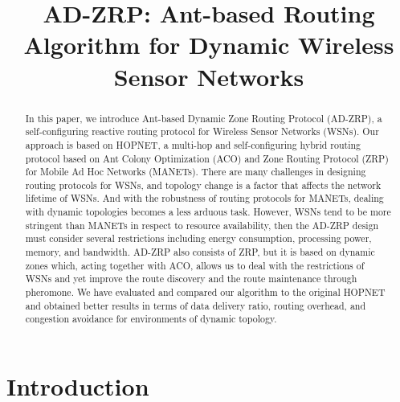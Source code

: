 \documentclass[conference]{IEEEtran}
\begin{document}
\title{AD-ZRP: Ant-based Routing Algorithm for Dynamic Wireless Sensor Networks}

\author{
}

\maketitle

\begin{abstract}
In this paper, we introduce Ant-based Dynamic Zone Routing Protocol (AD-ZRP), a self-configuring reactive routing protocol for Wireless Sensor Networks (WSNs).
Our approach is based on HOPNET, a multi-hop and self-configuring hybrid routing protocol based on Ant Colony Optimization (ACO) and Zone Routing Protocol (ZRP) for Mobile Ad Hoc Networks (MANETs).
There are many challenges in designing routing protocols for WSNs, and topology change is a factor that affects the network lifetime of WSNs.
And with the robustness of routing protocols for MANETs, dealing with dynamic topologies becomes a less arduous task.
However, WSNs tend to be more stringent than MANETs in respect to resource availability, then the AD-ZRP design must consider several restrictions including energy consumption, processing power, memory, and bandwidth.
AD-ZRP also consists of ZRP, but it is based on dynamic zones which, acting together with ACO, allows us to deal with the restrictions of WSNs and yet improve the route discovery and the route maintenance through pheromone.
We have evaluated and compared our algorithm to the original HOPNET and obtained better results in terms of data delivery ratio, routing overhead, and congestion avoidance for environments of dynamic topology.
\end{abstract}

\IEEEoverridecommandlockouts
{}
\IEEEpubidadjcol

\section{Introduction}
\label{introduction}
\end{document}
